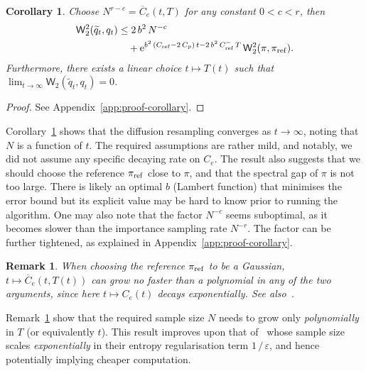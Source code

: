 \documentclass{article}
\newtheorem{corollary}{Corollary}
\newtheorem{remark}{Remark}
\begin{document}
\begin{corollary}
    \label{corollary:asymp}
    Choose $N^{r-c} = \overline{C}_e(t, T)$ for any constant $0<c<r$, then 
    \begin{equation*}
        \begin{split}
            \mathsf{W}_2^2(\widetilde{q}_t, q_t) &\leq 2 \, b^2 \, N^{-c} \\
            &\quad+ \mathrm{e}^{b^2 \,(C_{\mathrm{ref}} - 2\, C_p) \, t - 2 \, b^2 \, C_\mathrm{ref}^- \, T} \, \mathsf{W}_2^2(\pi, \pi_{\mathrm{ref}}). 
        \end{split}
    \end{equation*}
    Furthermore, there exists a linear choice $t\mapsto T(t)$ such that $\lim_{t\to\infty} \mathsf{W}_2(\widetilde{q}_t, q_t) = 0$.
\end{corollary}
%
\begin{proof}
    See Appendix~\ref{app:proof-corollary}.
\end{proof}
%
Corollary~\ref{corollary:asymp} shows that the diffusion resampling converges as $t\to\infty$, noting that $N$ is a function of $t$.  
The required assumptions are rather mild, and notably, we did not assume any specific decaying rate on $C_e$. 
The result also suggests that we should choose the reference $\pi_{\mathrm{ref}}$ close to $\pi$, and that the spectral gap of $\pi$ is not too large.
There is likely an optimal $b$ (Lambert function) that minimises the error bound but its explicit value may be hard to know prior to running the algorithm. 
One may also note that the factor $N^{-c}$ seems suboptimal, as it becomes slower than the importance sampling rate $N^{-r}$. 
The factor can be further tightened, as explained in Appendix~\ref{app:proof-corollary}.
%
\begin{remark}
	\label{remark:gaussian}
    When choosing the reference $\pi_{\mathrm{ref}}$ to be a Gaussian, $t\mapsto\overline{C}_e(t, T(t))$ can grow no faster than a polynomial in any of the two arguments, since here $t\mapsto C_e(t)$ decays exponentially. 
    See also~\citet[][Remark 3]{DeBortoli2025convergence}. 
\end{remark}
%
Remark~\ref{remark:gaussian} show that the required sample size $N$ needs to grow only \emph{polynomially} in $T$ (or equivalently $t$). 
This result improves upon that of~\citet{Corenflos2021} whose sample size scales \emph{exponentially} in their entropy regularisation term $1 \, / \, \varepsilon$, and hence potentially implying cheaper computation. 
\end{document}
